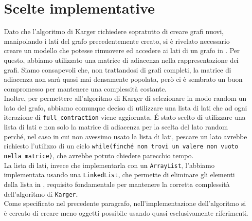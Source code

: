 \section{Scelte implementative}
Dato che l'algoritmo di Karger richiedere sopratutto di creare grafi nuovi, manipolando i lati del grafo precedentemente creato, si è rivelato necessario creare un modello che potesse rimuovere ed accedere ai lati di un grafo in . Per questo, abbiamo utilizzato una matrice di adiacenza nella rappresentazione dei grafi. Siamo consapevoli che, non trattandosi di grafi completi, la matrice di adiacenza non sarà quasi mai densamente popolata, però ci è sembrato un buon compromesso per mantenere una complessità costante.\\
Inoltre, per permettere all'algoritmo di Karger di selezionare in modo random un lato del grafo, abbiamo comunque deciso di utilizzare una lista di lati che ad ogni iterazione di \texttt{full\_contraction} viene aggiornata. \'E stato scelto di utilizzare una lista di lati e non solo la matrice di adiacenza per la scelta del lato random perché, nel caso in cui non avessimo usato la lista di lati, pescare un lato avrebbe richiesto l'utilizzo di un ciclo \texttt{while(finché non trovi un valere non vuoto nella matrice)}, che avrebbe potuto chiedere parecchio tempo.\\
La lista di lati, invece che implementarla con un \texttt{ArrayList}, l'abbiamo implementata usando una \texttt{LinkedList}, che permette di eliminare gli elementi della lista in , requisito fondamentale per mantenere la corretta complessità dell'algoritmo di \texttt{Karger}.\\ 
Come specificato nel precedente paragrafo, nell'implementazione dell'algoritmo si è cercato di creare meno oggetti possibile usando quasi esclusivamente riferimenti. 

